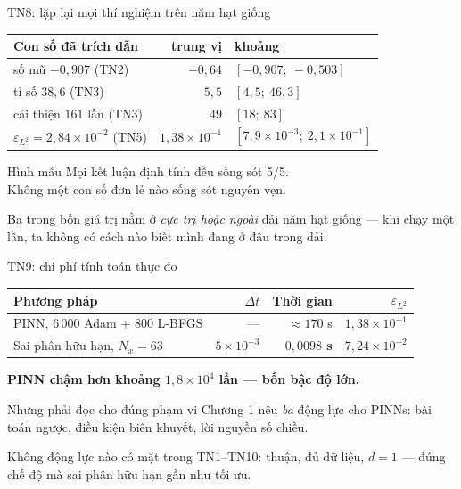 \documentclass[aspectratio=169,11pt]{beamer}
\newcommand{\good}[1]{\textcolor{good}{\textbf{#1}}}
\newcommand{\bad}[1]{\textcolor{bad}{\textbf{#1}}}
\begin{document}
\begin{frame}{TN8: lặp lại mọi thí nghiệm trên năm hạt giống}
\begin{table}
\small
\begin{tabular}{@{}lrl@{}}
\toprule
\textbf{Con số đã trích dẫn} & \textbf{trung vị} & \textbf{khoảng} \\
\midrule
số mũ $-0{,}907$ (TN2)            & $-0{,}64$ & $[-0{,}907;\ -0{,}503]$ \\
tỉ số $38{,}6$ (TN3)              & $5{,}5$   & $[4{,}5;\ 46{,}3]$ \\
cải thiện $161$ lần (TN3)         & $49$      & $[18;\ 83]$ \\
$\varepsilon_{L^2} = 2{,}84\times10^{-2}$ (TN5)
  & $1{,}38\times10^{-1}$ & $[7{,}9\times10^{-3};\ 2{,}1\times10^{-1}]$ \\
\bottomrule
\end{tabular}
\end{table}

\medskip
\begin{alertblock}{Hình mẫu}
\alert{Mọi kết luận định tính đều sống sót 5/5.\\
Không một con số đơn lẻ nào sống sót nguyên vẹn.}
\end{alertblock}

\footnotesize
Ba trong bốn giá trị nằm ở \emph{cực trị hoặc ngoài} dải năm hạt giống ---
khi chạy một lần, ta không có cách nào biết mình đang ở đâu trong dải.
\end{frame}

\begin{frame}{TN9: chi phí tính toán thực đo}
\small
\begin{table}
\small
\begin{tabular}{@{}lrrr@{}}
\toprule
\textbf{Phương pháp} & $\Delta t$ & \textbf{Thời gian} & $\varepsilon_{L^2}$ \\
\midrule
PINN, $6\,000$ Adam $+$ $800$ L-BFGS & --- & $\approx 170$ s & $1{,}38\times10^{-1}$ \\
Sai phân hữu hạn, $N_x = 63$ & $5\times10^{-3}$ & \good{$0{,}0098$ s} & $7{,}24\times10^{-2}$ \\
\bottomrule
\end{tabular}
\end{table}

\begin{center}
\bad{PINN chậm hơn khoảng $1{,}8\times10^{4}$ lần --- bốn bậc độ lớn.}
\end{center}

\medskip
\begin{block}{Nhưng phải đọc cho đúng phạm vi}
Chương 1 nêu \emph{ba} động lực cho PINNs: bài toán ngược, điều kiện biên khuyết,
lời nguyền số chiều.

\smallskip
\alert{Không động lực nào có mặt} trong TN1--TN10: thuận,
đủ dữ liệu, $d = 1$ --- đúng chế độ mà sai phân hữu hạn gần như tối ưu.
\end{block}
\end{frame}
\end{document}
